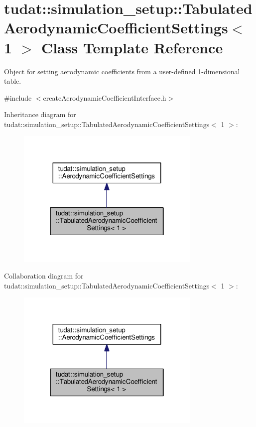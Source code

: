 \hypertarget{classtudat_1_1simulation__setup_1_1TabulatedAerodynamicCoefficientSettings_3_011_01_4}{}\section{tudat\+:\+:simulation\+\_\+setup\+:\+:Tabulated\+Aerodynamic\+Coefficient\+Settings$<$ 1 $>$ Class Template Reference}
\label{classtudat_1_1simulation__setup_1_1TabulatedAerodynamicCoefficientSettings_3_011_01_4}


Object for setting aerodynamic coefficients from a user-\/defined 1-\/dimensional table.  




{\ttfamily \#include $<$create\+Aerodynamic\+Coefficient\+Interface.\+h$>$}



Inheritance diagram for tudat\+:\+:simulation\+\_\+setup\+:\+:Tabulated\+Aerodynamic\+Coefficient\+Settings$<$ 1 $>$\+:
\nopagebreak
\begin{figure}[H]
\begin{center}
\leavevmode
\includegraphics[width=250pt]{classtudat_1_1simulation__setup_1_1TabulatedAerodynamicCoefficientSettings_3_011_01_4__inherit__graph}
\end{center}
\end{figure}


Collaboration diagram for tudat\+:\+:simulation\+\_\+setup\+:\+:Tabulated\+Aerodynamic\+Coefficient\+Settings$<$ 1 $>$\+:
\nopagebreak
\begin{figure}[H]
\begin{center}
\leavevmode
\includegraphics[width=250pt]{classtudat_1_1simulation__setup_1_1TabulatedAerodynamicCoefficientSettings_3_011_01_4__coll__graph}
\end{center}
\end{figure}
